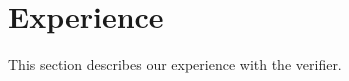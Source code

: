 \section{Experience}
\label{sec:experience}

This section describes our experience with the \civl verifier.
